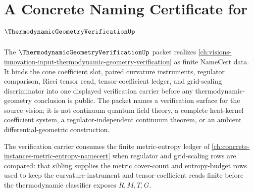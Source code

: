 \chapter{A Concrete Naming Certificate for $\ThermodynamicGeometryVerificationUp$}
\label{ch:concrete-instances-thermodynamic-geometry-verification-namecert}

The $\ThermodynamicGeometryVerificationUp$ packet realizes \autoref{ch:visions-innovation-input-thermodynamic-geometry-verification} as finite NameCert data. It binds the cone coefficient slot, paired curvature instruments, regulator comparison, Ricci tensor read, tensor-coefficient ledger, and grid-scaling discriminator into one displayed verification carrier before any thermodynamic-geometry conclusion is public. The packet names a verification surface for the source vision; it is not continuum quantum field theory, a complete heat-kernel coefficient system, a regulator-independent continuum theorem, or an ambient differential-geometric construction.

The verification carrier consumes the finite metric-entropy ledger of \autoref{ch:concrete-instances-metric-entropy-namecert} when regulator and grid-scaling rows are compared: that sibling supplies the metric cover-count and entropy-budget rows used to keep the curvature-instrument and tensor-coefficient reads finite before the thermodynamic classifier exposes $R,M,T,G$.

